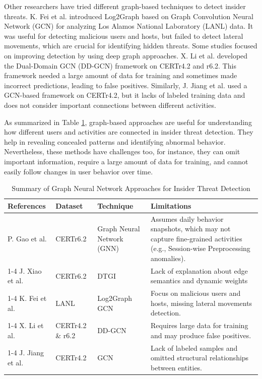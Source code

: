 Other researchers have tried different graph-based techniques to detect insider threats. K. Fei et al. \cite{fei2022graph} introduced Log2Graph based on Graph Convolution Neural Network (GCN) for analyzing Los Alamos National Laboratory (LANL) data. It was useful for detecting malicious users and hosts, but failed to detect lateral movements, which are crucial for identifying hidden threats. Some studies focused on improving detection by using deep graph approaches. X. Li et al. \cite{li2023high} developed the Dual-Domain GCN (DD-GCN) framework on CERTr4.2 and r6.2. This framework needed a large amount of data for training and sometimes made incorrect predictions, leading to false positives. Similarly, J. Jiang et al. \cite{jiang2019anomaly} used a GCN-based framework on CERTr4.2, but it lacks of labeled training data and does not consider important connections between different activities.  

As summarized in Table \ref{tbl3}, graph-based approaches are useful for understanding how different users and activities are connected in insider threat detection. They help in revealing concealed patterns and identifying abnormal behavior. Nevertheless, these methods have challenges too, for instance, they can omit important information, require a large amount of data for training, and cannot easily follow changes in user behavior over time. 

\begin{table}[!ht]
\caption{Summary of Graph Neural Network Approaches for Insider Threat Detection}
\begin{tabular}{p{2.5cm}p{3cm}  p{2cm}  p{4.5cm} }
\toprule
\textbf{References} & \textbf{Dataset} & \textbf{Technique}  & \textbf{Limitations} \\
\midrule
P. Gao et al. \cite{gao2025deep} & CERTr6.2 & Graph Neural Network (GNN) & Assumes daily behavior snapshots, which may not capture fine-grained activities (e.g., Session-wise Preprocessing anomalies).\\
\cmidrule(lr){1-4}
 J. Xiao et al. \cite{xiao2022robust} & CERTr6.2& DTGI & Lack of explanation about edge semantics and dynamic weights \\
\cmidrule(lr){1-4}
 K. Fei et al. \cite{fei2022graph} & LANL & Log2Graph GCN & Focus on malicious users and hosts, missing lateral movements detection. \\
\cmidrule(lr){1-4}
 X. Li et al. \cite{li2023high}& CERTr4.2 \& r6.2& DD-GCN & Requires large data for training and may produce false positives. \\
\cmidrule(lr){1-4}
J. Jiang et al. \cite{jiang2019anomaly}& CERTr4.2& GCN & Lack of labeled samples and omitted structural relationships between entities. \\
\bottomrule
\end{tabular}

\label{tbl3}
\end{table}
